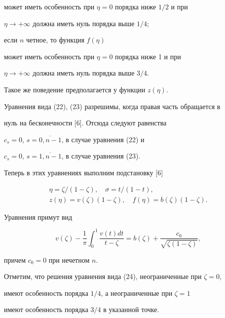 может иметь особенность при $\eta = 0$ порядка ниже $1/2$ и при


$\eta \rightarrow +\infty$ должна иметь нуль порядка выше $1/4$;


если $n$ четное, то функция $f(\eta)$


может иметь особенность при $\eta = 0$ порядка ниже 1 и при


$\eta \rightarrow +\infty$ должна иметь нуль порядка выше $3/4$.


Такое же поведение предполагается у функции $z(\eta)$.





Уравнения вида (22), (23) разрешимы, когда правая часть обращается в


нуль на бесконечности [6]. Отсюда следуют равенства


$c_s=0$, $s=\overline{0,n-1}$, в случае уравнения (22) и


$c_s=0$, $s=\overline{1,n-1}$, в случае уравнения (23).


Теперь в этих уравнениях выполним подстановку [6]


\begin{gather*}


\eta=\zeta /(1-\zeta ), \quad \sigma = t/(1-t),\\


z(\eta)=v(\zeta)(1-\zeta),\quad f(\eta)=b(\zeta)(1-\zeta).


\end{gather*}


Уравнения примут вид


\begin{equation}


v(\zeta)-\frac{1}{\pi} \int^1_0\frac{v(t)dt}


{t -\zeta}=b(\zeta)+ \frac{c_0}{\sqrt{\zeta(1-\zeta)}},


\end{equation}


причем $c_0=0$ при нечетном $n$.





Отметим, что решения уравнения вида (24), неограниченные при $\zeta=0$,


имеют особенность порядка $1/4$, а неограниченные при $\zeta=1$


имеют особенность порядка $3/4$ в указанной точке.





